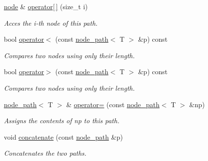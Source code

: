 \begin{DoxyCompactItemize}
\hyperlink{namespacelgraph_a397169dd66adf725210a30fb7251773e}{node} \& \hyperlink{classlgraph_1_1node__path_ad7cf4262b891ee24938fb0b91ac3cfd8}{operator\mbox{[}$\,$\mbox{]}} (size\+\_\+t i)
\begin{DoxyCompactList}\small\item\em Acces the {\itshape i-\/th} node of this path. \end{DoxyCompactList}\item 
\mbox{\label{classlgraph_1_1node__path_ad5a3e24dcabbb854eb8ffc74e86b244b}} 
bool \hyperlink{classlgraph_1_1node__path_ad5a3e24dcabbb854eb8ffc74e86b244b}{operator$<$} (const \hyperlink{classlgraph_1_1node__path}{node\+\_\+path}$<$ T $>$ \&p) const
\begin{DoxyCompactList}\small\item\em Compares two nodes using only their length. \end{DoxyCompactList}\item 
\mbox{\label{classlgraph_1_1node__path_a9144df723c0cc5df7c6d29b54f5f0838}} 
bool \hyperlink{classlgraph_1_1node__path_a9144df723c0cc5df7c6d29b54f5f0838}{operator$>$} (const \hyperlink{classlgraph_1_1node__path}{node\+\_\+path}$<$ T $>$ \&p) const
\begin{DoxyCompactList}\small\item\em Compares two nodes using only their length. \end{DoxyCompactList}\item 
\mbox{\label{classlgraph_1_1node__path_a36b5a71ed3dd72269e7eca72ed12dfcc}} 
\hyperlink{classlgraph_1_1node__path}{node\+\_\+path}$<$ T $>$ \& \hyperlink{classlgraph_1_1node__path_a36b5a71ed3dd72269e7eca72ed12dfcc}{operator=} (const \hyperlink{classlgraph_1_1node__path}{node\+\_\+path}$<$ T $>$ \&np)
\begin{DoxyCompactList}\small\item\em Assigns the contents of {\itshape np} to this path. \end{DoxyCompactList}\item 
void \hyperlink{classlgraph_1_1node__path_a574b282afe2e987afeb4433addebe48e}{concatenate} (const \hyperlink{classlgraph_1_1node__path}{node\+\_\+path} \&p)
\begin{DoxyCompactList}\small\item\em Concatenates the two paths. \end{DoxyCompactList}\item 

\end{DoxyCompactItemize}
